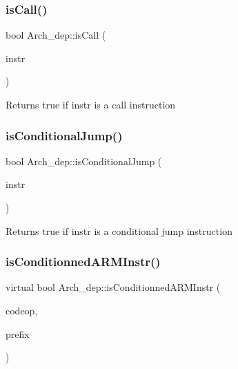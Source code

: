 \subsubsection{\texorpdfstring{is\+Call()}{isCall()}}
{\footnotesize\ttfamily bool Arch\+\_\+dep\+::is\+Call (\begin{DoxyParamCaption}\item[{const \hyperlink{classObjdumpInstruction}{Objdump\+Instruction} \&}]{instr }\end{DoxyParamCaption})}

Returns true if instr is a call instruction \mbox{\label{classArch__dep_ac1df28408e3ed4390827a8922d833383}} 
\subsubsection{\texorpdfstring{is\+Conditional\+Jump()}{isConditionalJump()}}
{\footnotesize\ttfamily bool Arch\+\_\+dep\+::is\+Conditional\+Jump (\begin{DoxyParamCaption}\item[{const \hyperlink{classObjdumpInstruction}{Objdump\+Instruction} \&}]{instr }\end{DoxyParamCaption})}

Returns true if instr is a conditional jump instruction \mbox{\label{classArch__dep_a41eb152029e2792b59337bc4b370ec9f}} 
\subsubsection{\texorpdfstring{is\+Conditionned\+A\+R\+M\+Instr()}{isConditionnedARMInstr()}}
{\footnotesize\ttfamily virtual bool Arch\+\_\+dep\+::is\+Conditionned\+A\+R\+M\+Instr (\begin{DoxyParamCaption}\item[{const string \&}]{codeop,  }\item[{const string \&}]{prefix }\end{DoxyParamCaption})\hspace{0.3cm}{\ttfamily [pure virtual]}}



